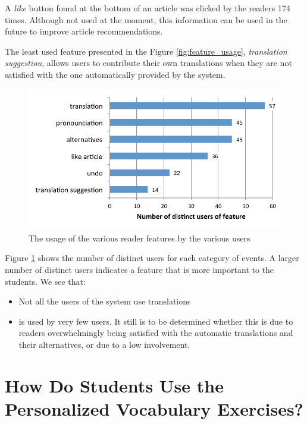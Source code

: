 A {\em like} button found at the bottom of an article  was clicked by the readers 174 times. Although not used at the moment, this information can be used in the future to improve article recommendations.

The least used feature presented in the Figure \ref{fig:feature_usage}, {\em translation suggestion}, allows users to contribute their own translations when they are not satisfied with the one automatically provided by the system. 

  \begin{figure}[h!]
  \centering
    \includegraphics[width=0.6\columnwidth]{figures/reader_feature_usage_per_user}
    \caption{The usage of the various reader features by the various users }
    \label{fig:usage_per_user}
  \end{figure}


Figure \ref{fig:usage_per_user} shows the number of distinct users for each category of events. A larger number of distinct users indicates a feature that is more important to the students. We see that: 
\begin{itemize}
  \item Not all the users of the system use translations
  \item {} is used by very few users. It still is to be determined whether this is due to readers overwhelmingly being satisfied with the automatic translations and their alternatives, or due to a low involvement. 
\end{itemize}



\section{How Do Students Use the Personalized Vocabulary Exercises?}


